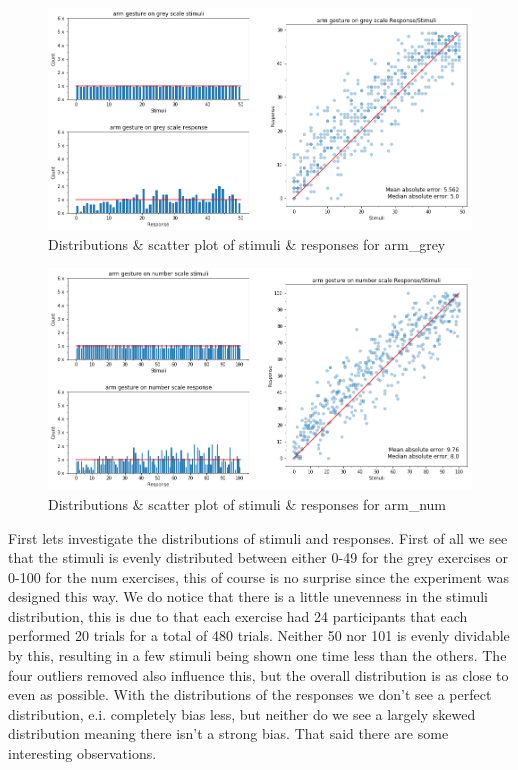 \begin{figure}[p]
    \centering
    \includegraphics[width=1.2\textwidth]{figures/dist_scatter5.png}
    \caption{Distributions \& scatter plot of stimuli \& responses for arm\_grey}
    \label{dist_scatter5}
\end{figure}

\begin{figure}[p]
    \centering
    \includegraphics[width=1.2\textwidth]{figures/dist_scatter6.png}
    \caption{Distributions \& scatter plot of stimuli \& responses for arm\_num}
    \label{dist_scatter6}
\end{figure}

First lets investigate the distributions of stimuli and responses. First of all we see that the stimuli is evenly distributed between either 0-49 for the grey exercises or 0-100 for the num exercises, this of course is no surprise since the experiment was designed this way. We do notice that there is a little unevenness in the stimuli distribution, this is due to that each exercise had 24 participants that each performed 20 trials for a total of 480 trials. Neither 50 nor 101 is evenly dividable by this, resulting in a few stimuli being shown one time less than the others. The four outliers removed also influence this, but the overall distribution is as close to even as possible. With the distributions of the responses we don't see a perfect distribution, e.i. completely bias less, but neither do we see a largely skewed distribution meaning there isn't a strong bias. That said there are some interesting observations.

